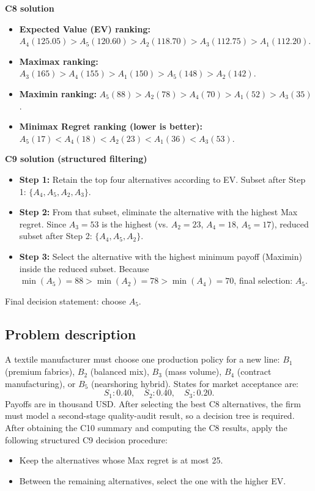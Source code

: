 \begin{ExamProblems}
		\textbf{C8 solution}
		\begin{itemize}
			\item \textbf{Expected Value (EV) ranking:} $A_4(125.05)>A_5(120.60)>A_2(118.70)>A_3(112.75)>A_1(112.20)$.
			\item \textbf{Maximax ranking:} $A_3(165)>A_4(155)>A_1(150)>A_5(148)>A_2(142)$.
			\item \textbf{Maximin ranking:} $A_5(88)>A_2(78)>A_4(70)>A_1(52)>A_3(35)$.
			\item \textbf{Minimax Regret ranking (lower is better):} $A_5(17)<A_4(18)<A_2(23)<A_1(36)<A_3(53)$.
		\end{itemize}

		\textbf{C9 solution (structured filtering)}
		\begin{itemize}
			\item \textbf{Step 1:} Retain the top four alternatives according to EV. Subset after Step 1: $\{A_4,A_5,A_2,A_3\}$.
			\item \textbf{Step 2:} From that subset, eliminate the alternative with the highest Max regret. Since $A_3=53$ is the highest (vs. $A_2=23$, $A_4=18$, $A_5=17$), reduced subset after Step 2: $\{A_4,A_5,A_2\}$.
			\item \textbf{Step 3:} Select the alternative with the highest minimum payoff (Maximin) inside the reduced subset. Because $\min(A_5)=88>\min(A_2)=78>\min(A_4)=70$, final selection: $A_5$.
		\end{itemize}
		Final decision statement: choose $A_5$.

		\newpage
		\item
		\subsection*{Problem description}
		A textile manufacturer must choose one production policy for a new line:
		$B_1$ (premium fabrics), $B_2$ (balanced mix), $B_3$ (mass volume), $B_4$ (contract manufacturing), or $B_5$ (nearshoring hybrid).
		States for market acceptance are:
		\[
		S_1:0.40,\quad S_2:0.40,\quad S_3:0.20.
		\]
		Payoffs are in thousand USD.
		After selecting the best C8 alternatives, the firm must model a second-stage quality-audit result, so a decision tree is required.
		After obtaining the C10 summary and computing the C8 results, apply the following structured C9 decision procedure:
		\begin{itemize}
			\item Keep the alternatives whose Max regret is at most 25.
			\item Between the remaining alternatives, select the one with the higher EV.
		\end{itemize}


\end{ExamProblems}
